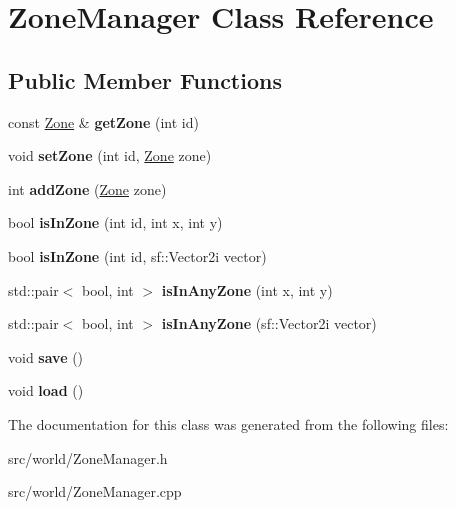 \hypertarget{classZoneManager}{\section{Zone\-Manager Class Reference}
\label{classZoneManager}
}
\subsection*{Public Member Functions}
\begin{DoxyCompactItemize}
\item 
\hypertarget{classZoneManager_ac543f20549084fb9ba57f7e949822fe8}{const \hyperlink{structZone}{Zone} \& {\bfseries get\-Zone} (int id)}\label{classZoneManager_ac543f20549084fb9ba57f7e949822fe8}

\item 
\hypertarget{classZoneManager_a4df31da6854b67e51fd7ec54186ebba0}{void {\bfseries set\-Zone} (int id, \hyperlink{structZone}{Zone} zone)}\label{classZoneManager_a4df31da6854b67e51fd7ec54186ebba0}

\item 
\hypertarget{classZoneManager_aed2219b748110c4b13d7673687340cc8}{int {\bfseries add\-Zone} (\hyperlink{structZone}{Zone} zone)}\label{classZoneManager_aed2219b748110c4b13d7673687340cc8}

\item 
\hypertarget{classZoneManager_a1a3746c0ebc7d065d54bab8d884503b4}{bool {\bfseries is\-In\-Zone} (int id, int x, int y)}\label{classZoneManager_a1a3746c0ebc7d065d54bab8d884503b4}

\item 
\hypertarget{classZoneManager_a0b9ab84b3162ba1c87a4afe84bb40b6f}{bool {\bfseries is\-In\-Zone} (int id, sf\-::\-Vector2i vector)}\label{classZoneManager_a0b9ab84b3162ba1c87a4afe84bb40b6f}

\item 
\hypertarget{classZoneManager_a1627d595ec442fcb82d4ea770006327c}{std\-::pair$<$ bool, int $>$ {\bfseries is\-In\-Any\-Zone} (int x, int y)}\label{classZoneManager_a1627d595ec442fcb82d4ea770006327c}

\item 
\hypertarget{classZoneManager_af99f3a88afa59f3df6fb3a83adf54844}{std\-::pair$<$ bool, int $>$ {\bfseries is\-In\-Any\-Zone} (sf\-::\-Vector2i vector)}\label{classZoneManager_af99f3a88afa59f3df6fb3a83adf54844}

\item 
\hypertarget{classZoneManager_a03e6c9f49bf83b0b8ce663d49e5f398b}{void {\bfseries save} ()}\label{classZoneManager_a03e6c9f49bf83b0b8ce663d49e5f398b}

\item 
\hypertarget{classZoneManager_aa9587473c290133ef47a835d362de011}{void {\bfseries load} ()}\label{classZoneManager_aa9587473c290133ef47a835d362de011}

\end{DoxyCompactItemize}


The documentation for this class was generated from the following files\-:\begin{DoxyCompactItemize}
\item 
src/world/Zone\-Manager.\-h\item 
src/world/Zone\-Manager.\-cpp\end{DoxyCompactItemize}

